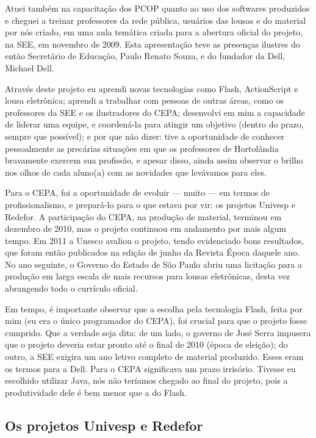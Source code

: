 Atuei também na capacitação dos PCOP quanto ao uso dos softwares produzidos e cheguei a treinar professores da rede pública, usuários das lousas e do material por nós criado, em uma aula temática criada para a abertura oficial do projeto, na SEE, em novembro de 2009. Esta apresentação teve as presenças ilustres do então Secretário de Educação, Paulo Renato Souza, e do fundador da Dell, Michael Dell.

Através deste projeto eu aprendi novas tecnologias como Flash, ActionScript e lousa eletrônica; aprendi a trabalhar com pessoas de outras áreas, como os professores da SEE e os ilustradores do CEPA; desenvolvi em mim a capacidade de liderar uma equipe, e coordená-la para atingir um objetivo (dentro do prazo, sempre que possível); e por que não dizer: tive a oportunidade de conhecer pessoalmente as precárias situações em que os professores de Hortolândia bravamente exercem sua profissão, e apesar disso, ainda assim observar o brilho nos olhos de cada aluno(a) com as novidades que levávamos para eles.

Para o CEPA, foi a oportunidade de evoluir --- muito --- em termos de profissionalismo, e prepará-lo para o que estava por vir: os projetos Univesp e Redefor. A participação do CEPA, na produção de material, terminou em dezembro de 2010, mas o projeto continuou em andamento por mais algum tempo. Em 2011 a Unesco avaliou o projeto, tendo evidenciado bons resultados, que foram então publicados na edição de junho da Revista Época daquele ano. No ano seguinte, o Governo do Estado de São Paulo abriu uma licitação para a produção em larga escala de mais recursos para lousas eletrônicas, desta vez abrangendo todo o currículo oficial.

Em tempo, é importante observar que a escolha pela tecnologia Flash, feita por mim (eu era o único programador do CEPA), foi crucial para que o projeto fosse cumprido. Que a verdade seja dita: de um lado, o governo de José Serra impusera que o projeto deveria estar pronto até o final de 2010 (época de eleição); do outro, a SEE exigira um ano letivo completo de material produzido. Esses eram os termos para a Dell. Para o CEPA significava um prazo irrisório. Tivesse eu escolhido utilizar Java, nós não teríamos chegado ao final do projeto, pois a produtividade dele é bem menor que a do Flash.

\subsection{Os projetos Univesp e Redefor}


